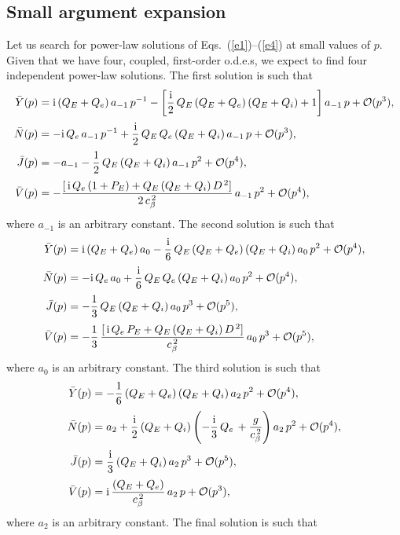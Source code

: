 \documentclass[12pt,prb,aps]{revtex4-1}
\begin{document}
\subsection{Small argument expansion}
Let us search for power-law solutions of Eqs.~(\ref{e1})--(\ref{e4}) at small values of $p$. Given that we have four, coupled, first-order o.d.e.s,
we expect to find four independent power-law solutions.
The first solution is
such that
\begin{align}
\bar{Y}(p) &= {\rm i}\,(Q_E+Q_e)\,a_{-1}\,p^{-1} -\left[\frac{{\rm i}}{2}\,Q_E\,(Q_E+Q_e)\,(Q_E+Q_i) +1\right]a_{-1}\,p +{\cal O}(p^3),\\[0.5ex]
\bar{N}(p)&= -{\rm i}\,Q_e\,a_{-1}\, p^{-1} + \frac{{\rm i}}{2}\,Q_E\,Q_e\,(Q_E+Q_i)\,a_{-1}\,p + {\cal O}(p^3),\\[0.5ex]
\bar{J}(p)&= -a_{-1}- \frac{1}{2}\,Q_E\,(Q_E+Q_i)\,a_{-1}\,p^2 +{\cal O}(p^4),\\[0.5ex]
\bar{V}(p)&=- \frac{[\,{\rm i}\,Q_e\,(1+P_E) +Q_E\,(Q_E+Q_i)\,D^{\,2}]}{2\,c_\beta^{\,2}}\,a_{-1}\,p^2+{\cal O}(p^4),
\end{align}
where $a_{-1}$ is an arbitrary constant. 
The second solution is such that
\begin{align}
\bar{Y}(p) &= {\rm i}\,(Q_E+Q_e)\,a_0-\frac{{\rm i}}{6}\,Q_E\,(Q_E+Q_e)\,(Q_E+Q_i)\,a_0\,p^2 +{ \cal O}(p^4),\\[0.5ex]
\bar{N}(p) &= -{\rm i}\,Q_e\,a_0+\frac{{\rm i}}{6}\,Q_E\,Q_e\,(Q_E+Q_i)\,a_0\,p^2+{\cal O}(p^4),\\[0.5ex]
\bar{J}(p)&= -\frac{1}{3}\,Q_E\,(Q_E+Q_i)\,a_0\,p^3+{\cal O}(p^5),\\[0.5ex]
\bar{V}(p)&= -\frac{1}{3}\,\frac{[\,{\rm i}\,Q_e\,P_E + Q_E\,(Q_E+Q_i)\,D^{\,2}]}{c_\beta^{\,2}}\,a_0\,p^3+{\cal O}(p^5),
\end{align}
where $a_0$ is an arbitrary constant. 
The third solution is such that
\begin{align}
\bar{Y}(p) &= -\frac{1}{6}\,(Q_E+Q_e)\,(Q_E+Q_i)\,a_2\,p^2+{\cal O}(p^4),\\[0.5ex]
\bar{N}(p) &= a_2+\frac{{\rm i}}{2}\,(Q_E+Q_i)\left(-\frac{{\rm i}}{3}\,Q_e\,+ \frac{g}{c_\beta^{\,2}}\right)a_2\,p^2+{\cal O}(p^4),\\[0.5ex]
\bar{J}(p) &=\frac{{\rm i}}{3}\,(Q_E+Q_i)\,a_2\,p^3+{\cal O}(p^5),\\[0.5ex]
\bar{V}(p) &={\rm i}\,\frac{(Q_E+Q_e)}{c_\beta^{\,2}}\,a_2\,p+{\cal O}(p^3),
\end{align}
where $a_2$ is an arbitrary constant. 
The final solution is such that
\end{document}
